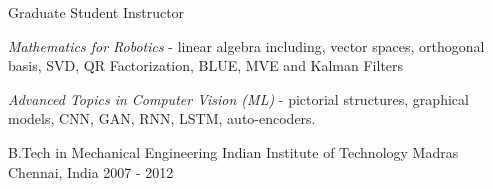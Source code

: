 \begin{cventries2}
\cventry
{Graduate Student Instructor} %
{} %
{} %
{} %
{
	\begin{cvitems} %
		\item {\emph{Mathematics for Robotics} - linear algebra including, vector spaces, orthogonal basis, SVD, QR Factorization, BLUE, MVE and Kalman Filters}
		\item {\emph{Advanced Topics in Computer Vision (ML)} - pictorial structures, graphical models, CNN, GAN, RNN, LSTM, auto-encoders. }
	\end{cvitems}
}
\vspace{0.2cm}
\cventry
{B.Tech in Mechanical Engineering} %
{Indian Institute of Technology Madras} %
{Chennai, India} %
{2007 - 2012} %
{}
\vspace{-0.5cm}
\end{cventries2}





